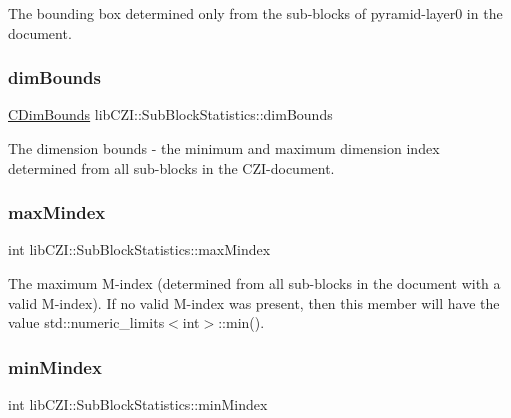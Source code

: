 The bounding box determined only from the sub-\/blocks of pyramid-\/layer0 in the document. \mbox{\label{structlib_c_z_i_1_1_sub_block_statistics_a10b6e7fb9312e93b1e9785daed56e44e}} 
\subsubsection{\texorpdfstring{dim\+Bounds}{dimBounds}}
{\footnotesize\ttfamily \hyperlink{classlib_c_z_i_1_1_c_dim_bounds}{C\+Dim\+Bounds} lib\+C\+Z\+I\+::\+Sub\+Block\+Statistics\+::dim\+Bounds}

The dimension bounds -\/ the minimum and maximum dimension index determined from all sub-\/blocks in the C\+Z\+I-\/document. \mbox{\label{structlib_c_z_i_1_1_sub_block_statistics_ad49c1710047fea5751e8b27263b0c62d}} 
\subsubsection{\texorpdfstring{max\+Mindex}{maxMindex}}
{\footnotesize\ttfamily int lib\+C\+Z\+I\+::\+Sub\+Block\+Statistics\+::max\+Mindex}

The maximum M-\/index (determined from all sub-\/blocks in the document with a valid M-\/index). If no valid M-\/index was present, then this member will have the value std\+::numeric\+\_\+limits$<$int$>$\+::min(). \mbox{\label{structlib_c_z_i_1_1_sub_block_statistics_a3123641e5b748a84744082a651f199a9}} 
\subsubsection{\texorpdfstring{min\+Mindex}{minMindex}}
{\footnotesize\ttfamily int lib\+C\+Z\+I\+::\+Sub\+Block\+Statistics\+::min\+Mindex}

